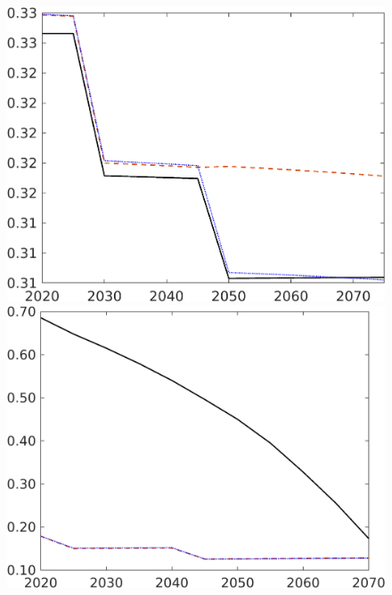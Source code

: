 \begin{figure}[h!!]
\begin{minipage}[]{0.32\textwidth}
	\end{minipage}
	\begin{minipage}[]{0.32\textwidth}
		\includegraphics[width=1\textwidth]{../../codding_model/own_basedOnFried/optimalPol_190722_tidiedUp/figures/all_July22/hl_CompEffOPT_T_NoTaus_bb3_pol4_spillover0_noskill0_sep1_xgrowth0_etaa0.79_lgd0_lff0.png}
	\end{minipage}
	\begin{minipage}[]{0.32\textwidth}
		\includegraphics[width=1\textwidth]{../../codding_model/own_basedOnFried/optimalPol_190722_tidiedUp/figures/all_July22/gAagg_CompEffOPT_T_NoTaus_bb3_pol4_spillover0_noskill0_sep1_xgrowth0_etaa0.79_lgd0_lff0.png}

\end{minipage}
\end{figure}
